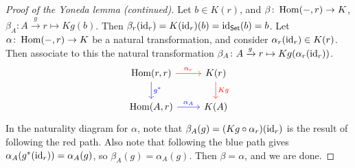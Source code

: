 \documentclass[xcolor=dvipsnames]{beamer}
\begin{document}
    \begin{frame}[fragile]
        \begin{proof}[Proof of the Yoneda lemma (continued)]

            Let $b \in K(r)$, and $\beta  \colon \operatorname{Hom}(-,r) \to K$, $\beta _A \colon A \xrightarrow gr \mapsto  Kg(b)$. Then $\beta _r(\operatorname{id}_r)=K(\operatorname{id}_r)(b)=\operatorname{id} _{\mathsf{Set} }(b)=b$. %
            Let $\alpha \colon \operatorname{Hom}(-,r) \to K$ be a natural transformation, and consider $\alpha _r(\operatorname{id}_r) \in K(r)$. Then associate to this the natural transformation $\beta _A \colon A \xrightarrow gr \mapsto  Kg(\alpha _r(\operatorname{id}_r))$. \[
           \begin{tikzcd}
{\Hom(r,r)} \arrow[d, "g^*",blue] \arrow[r, "\alpha_r",red] & K(r) \arrow[d, "Kg",red] \\
{\Hom(A,r)} \arrow[r, "\alpha_A",blue]                  & K(A)                
\end{tikzcd} 
            \] In the naturality diagram for $\alpha $, note that $\beta _A(g)=(Kg \circ \alpha _r)(\operatorname{id}_r)$ is the result of following the red path. Also note that following the blue path gives $\alpha _A(g^*(\operatorname{id}_r))=\alpha _A(g)$, so $\beta _A(g)=\alpha _A(g)$. Then $\beta =\alpha $, and we are done.
       \end{proof} 
    \end{frame}
\end{document}
